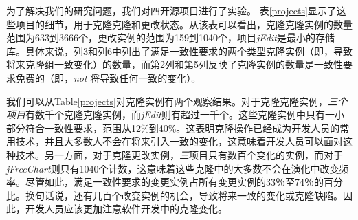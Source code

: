 {%

为了解决我们的研究问题，我们对{四}开源项目进行了实验。
表\ref{projects}显示了这些项目的细节，用于克隆克隆和更改状态。从该表可以看出，克隆克隆实例的数量范围为633到3666个，更改实例的范围为159到1040个，项目{\em jEdit}是最小的存储库。具体来说，列3和列6中列出了满足一致性要求的两个类型克隆实例（即，导致将来克隆组一致变化）的数量，而第2列和第5列反映了克隆实例的数量是一致性要求免费的（即，{\em not \/}将导致任何一致的变化）。

我们可以从Table\ref{projects}对克隆实例有两个观察结果。对于克隆克隆实例，{\em  三个项目}有数千个克隆克隆实例，而{\em jEdit}则有超过一千个。这些克隆实例中只有一小部分符合一致性要求，范围从12\%到40\%。这表明克隆操作已经成为开发人员的常用技术，并且大多数人不会在将来引入一致的变化，这意味着开发人员可以面对这种技术。另一方面，对于克隆更改实例，{\em  三}项目只有数百个变化的实例，而对于{\em  jFreeChart}则只有1040个计数，这意味着这些克隆中的大多数不会在演化中改变频率。尽管如此，满足一致性要求的变更实例占所有变更实例的33％至74％的百分比。换句话说，还有几百个改变实例的机会，导致将来一致的变化或克隆缺陷。因此，开发人员应该更加注意软件开发中的克隆变化。

}

